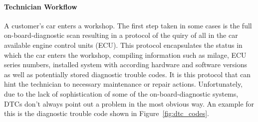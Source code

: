 \paragraph{Technician Workflow}
A customer's car enters a workshop. 
The first step taken in some cases is the full on-board-diagnostic scan resulting in a protocol of the quiry of all in the car available engine control units (ECU). 
This protocol encapsulates the status in which the car enters the workshop, compiling information such as milage, ECU series numbers, installed system with according hardware and software versions as well as potentially stored diagnostic trouble codes.
It is this protocol that can hint the technician to necessary maintenance or repair actions.
Unfortunately, due to the lack of sophistication of some of the on-board-diagnostic systems, DTCs don't always point out a problem in the most obvious way. 
An example for this is the diagnostic trouble code shown in Figure~\ref{fig:dtc_codes}.


